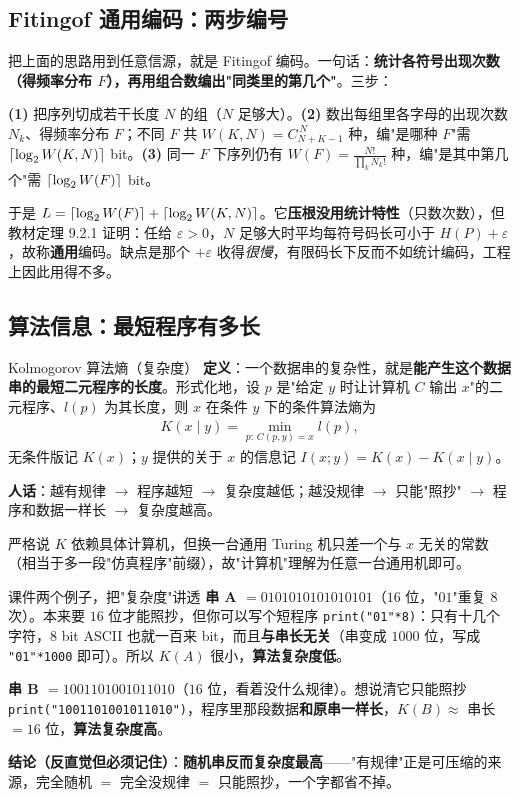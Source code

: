 \subsection{Fitingof 通用编码：两步编号}

把上面的思路用到任意信源，就是 Fitingof 编码。一句话：\textbf{统计各符号出现次数（得频率分布 $F$），再用组合数编出"同类里的第几个"}。三步：

\textbf{(1)} 把序列切成若干长度 $N$ 的组（$N$ 足够大）。\textbf{(2)} 数出每组里各字母的出现次数 $N_k$、得频率分布 $F$；不同 $F$ 共 $W(K,N)=C_{N+K-1}^{\,N}$ 种，编"是哪种 $F$"需 $\lceil\log_{2} W(K,N)\rceil$ bit。\textbf{(3)} 同一 $F$ 下序列仍有 $W(F)=\frac{N!}{\prod_kN_k!}$ 种，编"是其中第几个"需 $\lceil\log_{2} W(F)\rceil$ bit。

于是 $L=\lceil\log_{2} W(F)\rceil+\lceil\log_{2} W(K,N)\rceil$。它\textbf{压根没用统计特性}（只数次数），但教材定理 9.2.1 证明：任给 $\varepsilon>0$，$N$ 足够大时平均每符号码长可小于 $H(P)+\varepsilon$，故称\textbf{通用}编码。缺点是那个 $+\varepsilon$ 收得\emph{很慢}，有限码长下反而不如统计编码，工程上因此用得不多。

\subsection{算法信息：最短程序有多长}

\begin{defbox}{Kolmogorov 算法熵（复杂度）}
\textbf{定义}：一个数据串的复杂性，就是\textbf{能产生这个数据串的最短二元程序的长度}。形式化地，设 $p$ 是"给定 $y$ 时让计算机 $C$ 输出 $x$"的二元程序、$l(p)$ 为其长度，则 $x$ 在条件 $y$ 下的条件算法熵为
\begin{align*}
K(x\mid y)=\min_{p:\,C(p,y)=x} l(p),
\end{align*}
无条件版记 $K(x)$；$y$ 提供的关于 $x$ 的信息记 $I(x;y)=K(x)-K(x\mid y)$。

\textbf{人话}：越有规律 $\to$ 程序越短 $\to$ 复杂度越低；越没规律 $\to$ 只能"照抄" $\to$ 程序和数据一样长 $\to$ 复杂度越高。
\end{defbox}

严格说 $K$ 依赖具体计算机，但换一台通用 Turing 机只差一个与 $x$ 无关的常数（相当于多一段"仿真程序"前缀），故"计算机"理解为任意一台通用机即可。

\begin{calc}{课件两个例子，把"复杂度"讲透}
\textbf{串 A $=0101010101010101$}（$16$ 位，"$01$"重复 $8$ 次）。本来要 $16$ 位才能照抄，但你可以写个短程序 \texttt{print("01"*8)}：只有十几个字符，$8$ bit ASCII 也就一百来 bit，而且\textbf{与串长无关}（串变成 $1000$ 位，写成 \texttt{"01"*1000} 即可）。所以 $K(A)$ 很小，\textbf{算法复杂度低}。

\textbf{串 B $=1001101001011010$}（$16$ 位，看着没什么规律）。想说清它只能照抄 \texttt{print("1001101001011010")}，程序里那段数据\textbf{和原串一样长}，$K(B)\approx$ 串长 $=16$ 位，\textbf{算法复杂度高}。

\textbf{结论（反直觉但必须记住）}：\textbf{随机串反而复杂度最高}——"有规律"正是可压缩的来源，完全随机 $=$ 完全没规律 $=$ 只能照抄，一个字都省不掉。
\end{calc}

